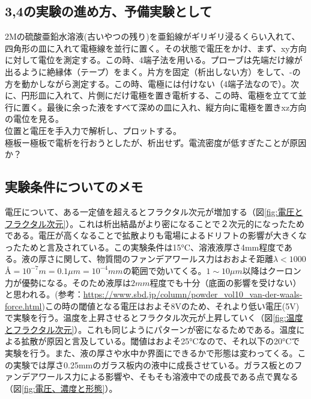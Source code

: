 \documentclass{ltjsarticle}
\begin{document}
\subsection{3,4の実験の進め方、予備実験として}
2Mの硫酸亜鉛水溶液(古いやつの残り)を亜鉛線がギリギリ浸るくらい入れて、四角形の皿に入れて電極線を並行に置く。その状態で電圧をかけ、まず、xy方向に対して電位を測定する。この時、4端子法を用いる。プローブは先端だけ線が出るように絶縁体（テープ）をまく。片方を固定（析出しない方）をして、-の方を動かしながら測定する。この時、電極には付けない（4端子法なので）。次に、円形皿に入れて、片側にだけ電極を置き電析する、この時、電極を立てて並行に置く。最後に余った液をすべて深めの皿に入れ、縦方向に電極を置きxz方向の電位を見る。\\
位置と電圧を手入力で解析し、プロットする。\\
\rightarrow 極板ー極板で電析を行おうとしたが、析出せず。電流密度が低すぎたことが原因か？
\subsection{実験条件についてのメモ}
電圧について、ある一定値を超えるとフラクタル次元が増加する（図\ref{fig:電圧とフラクタル次元}）。これは析出結晶がより密になることで２次元的になったためである\cite{matsushita1984fractal}。電圧が高くなることで拡散よりも電場によるドリフトの影響が大きくなったためと言及されている。この実験条件は15\si{\degreeCelsius}、溶液液厚さ4\si{mm}程度である。液の厚さに関して、物質間のファンデアワールス力はおおよそ距離$\lambda<1000$ \AA $=10^{-7}\si{m}=0.1\si{\mu m}=10^{-4}\si{mm}$の範囲で効いてくる。$1\sim10\si{\mu m}$以降はクーロン力が優勢になる。そのため液厚は$2\si{mm}$程度でも十分（底面の影響を受けない）と思われる\cite{表面張力の物理学}。(参考：\url{https://www.sbd.jp/column/powder_vol10_van-der-waals-force.html})この時の閾値となる電圧はおよそ8Vのため、それより{\color{blue}低い電圧(5V)}で実験を行う。温度を上昇させるとフラクタル次元が上昇していく\cite{suda2003temperature}（図\ref{fig:温度とフラクタル次元}）。これも同じようにパターンが密になるためである。温度による拡散が原因と言及している。閾値はおよそ25\si{\degreeCelsius}なので、それ以下の{\color{blue}20\si{\degreeCelsius}}で実験を行う。また、液の厚さや水中か界面にできるかで形態は変わってくる\cite{sawada1986dendritic}。この実験では厚さ0.25\si{mm}のガラス板内の液中に成長させている。ガラス板とのファンデアワールス力による影響や、そもそも溶液中での成長である点で異なる（図\ref{fig:電圧、濃度と形態}）。
\end{document}
